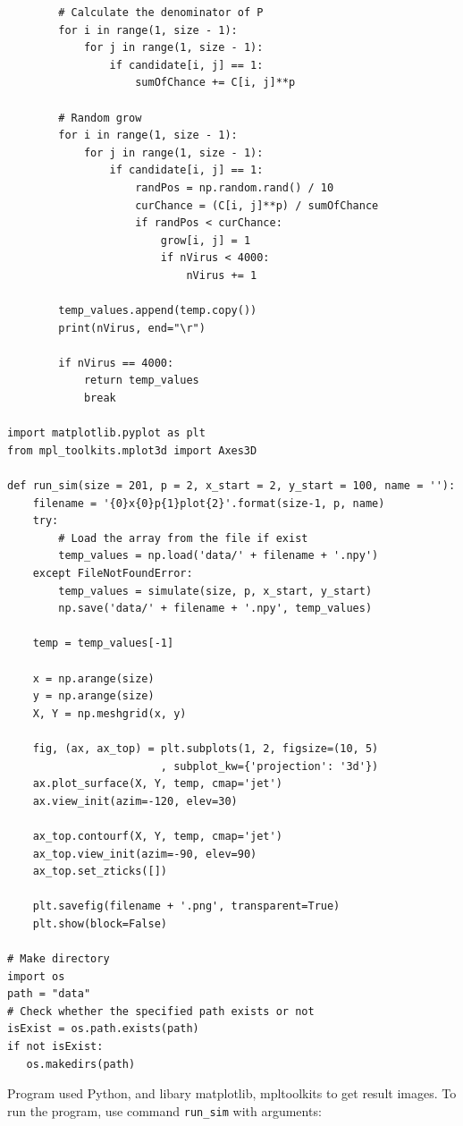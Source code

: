 \documentclass[a4paper,10pt,notitlepage]{article}
\begin{document}
{{{{\begin{lstlisting}
        # Calculate the denominator of P
        for i in range(1, size - 1):
            for j in range(1, size - 1):
                if candidate[i, j] == 1:
                    sumOfChance += C[i, j]**p

        # Random grow
        for i in range(1, size - 1):
            for j in range(1, size - 1):
                if candidate[i, j] == 1:
                    randPos = np.random.rand() / 10
                    curChance = (C[i, j]**p) / sumOfChance
                    if randPos < curChance:
                        grow[i, j] = 1
                        if nVirus < 4000:
                            nVirus += 1
                            
        temp_values.append(temp.copy())
        print(nVirus, end="\r")
        
        if nVirus == 4000:
            return temp_values
            break

import matplotlib.pyplot as plt
from mpl_toolkits.mplot3d import Axes3D
        
def run_sim(size = 201, p = 2, x_start = 2, y_start = 100, name = ''):
    filename = '{0}x{0}p{1}plot{2}'.format(size-1, p, name)
    try:
        # Load the array from the file if exist
        temp_values = np.load('data/' + filename + '.npy')
    except FileNotFoundError:
        temp_values = simulate(size, p, x_start, y_start)
        np.save('data/' + filename + '.npy', temp_values)

    temp = temp_values[-1]
    
    x = np.arange(size)
    y = np.arange(size)
    X, Y = np.meshgrid(x, y)

    fig, (ax, ax_top) = plt.subplots(1, 2, figsize=(10, 5)
                        , subplot_kw={'projection': '3d'})
    ax.plot_surface(X, Y, temp, cmap='jet')
    ax.view_init(azim=-120, elev=30)
    
    ax_top.contourf(X, Y, temp, cmap='jet')
    ax_top.view_init(azim=-90, elev=90)
    ax_top.set_zticks([])
    
    plt.savefig(filename + '.png', transparent=True)
    plt.show(block=False)
    
# Make directory
import os
path = "data"
# Check whether the specified path exists or not
isExist = os.path.exists(path)
if not isExist:
   os.makedirs(path)
\end{lstlisting}
\vspace{1.5cm}

Program used Python, and libary matplotlib, mpltoolkits to get result images.
To run the program, use command \texttt{run\_sim} with arguments:

}}}}
\end{document}
